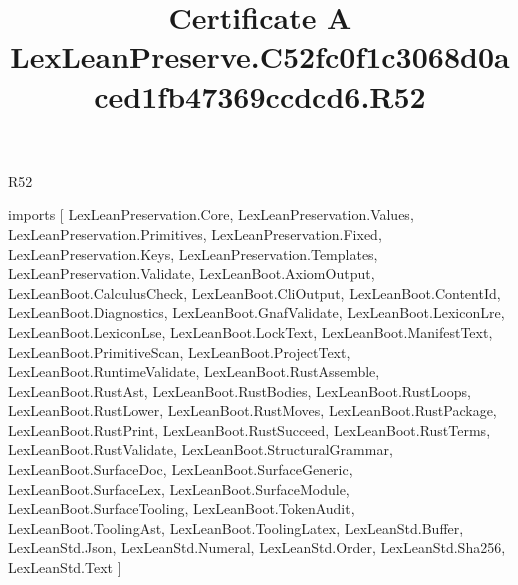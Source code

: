\begin{lexlean}{R52}
\title{Certificate A LexLeanPreserve.C52fc0f1c3068d0aced1fb47369ccdcd6.R52}
\begin{coremodule}
imports [
  LexLeanPreservation.Core,
  LexLeanPreservation.Values,
  LexLeanPreservation.Primitives,
  LexLeanPreservation.Fixed,
  LexLeanPreservation.Keys,
  LexLeanPreservation.Templates,
  LexLeanPreservation.Validate,
  LexLeanBoot.AxiomOutput,
  LexLeanBoot.CalculusCheck,
  LexLeanBoot.CliOutput,
  LexLeanBoot.ContentId,
  LexLeanBoot.Diagnostics,
  LexLeanBoot.GnafValidate,
  LexLeanBoot.LexiconLre,
  LexLeanBoot.LexiconLse,
  LexLeanBoot.LockText,
  LexLeanBoot.ManifestText,
  LexLeanBoot.PrimitiveScan,
  LexLeanBoot.ProjectText,
  LexLeanBoot.RuntimeValidate,
  LexLeanBoot.RustAssemble,
  LexLeanBoot.RustAst,
  LexLeanBoot.RustBodies,
  LexLeanBoot.RustLoops,
  LexLeanBoot.RustLower,
  LexLeanBoot.RustMoves,
  LexLeanBoot.RustPackage,
  LexLeanBoot.RustPrint,
  LexLeanBoot.RustSucceed,
  LexLeanBoot.RustTerms,
  LexLeanBoot.RustValidate,
  LexLeanBoot.StructuralGrammar,
  LexLeanBoot.SurfaceDoc,
  LexLeanBoot.SurfaceGeneric,
  LexLeanBoot.SurfaceLex,
  LexLeanBoot.SurfaceModule,
  LexLeanBoot.SurfaceTooling,
  LexLeanBoot.TokenAudit,
  LexLeanBoot.ToolingAst,
  LexLeanBoot.ToolingLatex,
  LexLeanStd.Buffer,
  LexLeanStd.Json,
  LexLeanStd.Numeral,
  LexLeanStd.Order,
  LexLeanStd.Sha256,
  LexLeanStd.Text
]


\end{coremodule}
\end{lexlean}
